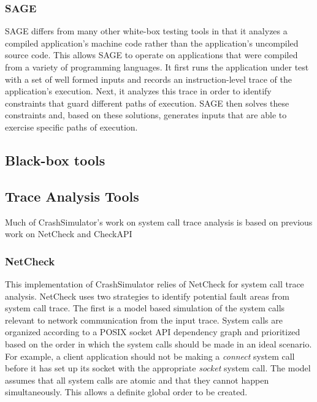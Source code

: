         \subsubsection{SAGE}

            SAGE differs from many other white-box testing tools in that it analyzes a compiled application's machine code
            rather than the application's uncompiled source code. This allows SAGE to operate on applications that were
            compiled from a variety of programming languages. It first runs the application under test with a set of well
            formed inputs and records an instruction-level trace of the application's execution. Next, it analyzes this
            trace in order to identify constraints that guard different paths of execution. SAGE then solves these
            constraints and, based on these solutions, generates inputs that are able to exercise specific paths of
            execution.

    \subsection{Black-box tools}


    \subsection{Trace Analysis Tools}

        Much of CrashSimulator's work on system call trace analysis is based on previous work on NetCheck and CheckAPI

        \subsubsection{NetCheck}

            This implementation of CrashSimulator relies of NetCheck for system call trace analysis. NetCheck uses two
            strategies to identify potential fault areas from system call trace. The first is a model based simulation
            of the system calls relevant to network communication from the input trace. System calls are organized
            according to a POSIX socket API dependency graph and prioritized based on the order in which the system
            calls should be made in an ideal scenario.  For example, a client application should not be making a
            \emph{connect} system call before it has set up its socket with the appropriate \emph{socket} system call.
            The model assumes that all system calls are atomic and that they cannot happen simultaneously. This allows a
            definite global order to be created.

